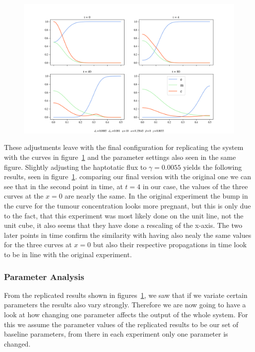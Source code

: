 \begin{figure}[h]
    \centering
    \includegraphics[width=\textwidth]{resources/images/2D_5e-4_1e-3_1e-3_10_0.35645_0_0.0055_1e-2_10_plot.png}
    \label{fig:2D_5e-4_1e-3_1e-3_10_0.35645_0_0.0055}
\end{figure}

These adjustments leave with the final configuration for replicating the system with the curves in figure~\ref{fig:2D_5e-4_1e-3_1e-3_10_0.35645_0_0.0055} and the parameter settings also seen in the same figure.
Slightly adjusting the haptotatic flux to $\gamma=0.0055$ yields the following results, seen in figure~\ref{fig:2D_5e-4_1e-3_1e-3_10_0.35645_0_0.0055}. comparing our final version with the original one we can see that in the second point in time, at $t=4$ in our case, the values of the three curves at the $x=0$ are nearly the same. In the original experiment the bump in the curve for the tumour concentration looks more pregnant, but this is only due to the fact, that this experiment was most likely done on the unit line, not the unit cube, it also seems that they have done a rescaling of the x-axis. The two later points in time confirm the similarity with having also nealy the same values for the three curves at $x=0$ but also their respective propagations in time look to be in line with the original experiment. 



\subsubsection{Parameter Analysis}
From the replicated results shown in figures~\ref{fig:2D_5e-4_1e-3_1e-3_10_0.35645_0_0.0055}, we saw that if we variate certain parameters the results also vary strongly. Therefore we are now going to have a look at how changing one parameter affects the output of the whole system. For this we assume the parameter values of the replicated results to be our set of baseline parameters, from there in each experiment only one parameter is changed. 

